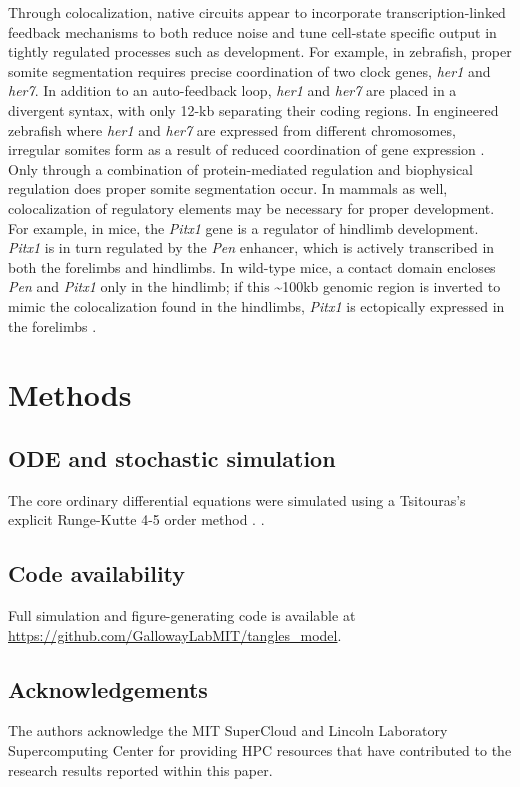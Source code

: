 \documentclass[11pt]{article}
\begin{document}
Through colocalization, native circuits appear to incorporate transcription-linked feedback mechanisms to both reduce noise and tune cell-state specific output in tightly regulated processes such as development. For example, in zebrafish, proper somite segmentation requires precise coordination of two clock genes, \textit{her1} and \textit{her7}. In addition to an auto-feedback loop, \textit{her1} and \textit{her7} are placed in a divergent syntax, with only 12-kb separating their coding regions. In engineered zebrafish where \textit{her1} and \textit{her7} are expressed from different chromosomes, irregular somites form as a result of reduced coordination of gene expression \parencite{zinaniPairingSegmentationClock2020}. Only through a combination of protein-mediated regulation and biophysical regulation does proper somite segmentation occur. In mammals as well, colocalization of regulatory elements may be necessary for proper development. For example, in mice, the \textit{Pitx1} gene is a regulator of hindlimb development. \textit{Pitx1} is in turn regulated by the \textit{Pen} enhancer, which is actively transcribed in both the forelimbs and hindlimbs. In wild-type mice, a contact domain encloses \textit{Pen} and \textit{Pitx1} only in the hindlimb; if this  \textasciitilde{}100kb genomic region is inverted to mimic the colocalization found in the hindlimbs, \textit{Pitx1} is ectopically expressed in the forelimbs \parencite{kragesteenDynamic3DChromatin2018}.

\section{Methods}
\subsection{ODE and stochastic simulation}
The core ordinary differential equations were simulated using a Tsitouras's explicit Runge-Kutte 4-5 order method \parencite{tsitourasRungeKuttaPairs2011}.
\parencite{rackauckasDifferentialEquationsJlPerformant2017}.

\subsection{Code availability}
Full simulation and figure-generating code is available at \url{https://github.com/GallowayLabMIT/tangles_model}.

\subsection{Acknowledgements}
The authors acknowledge the MIT SuperCloud and Lincoln Laboratory Supercomputing Center \parencite{reutherInteractiveSupercomputing402018} for providing HPC resources that have contributed to the research results reported within this paper.
\end{document}
